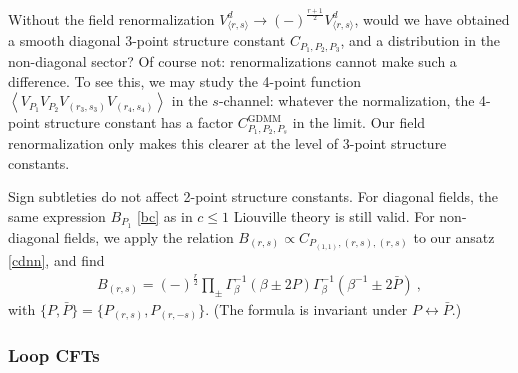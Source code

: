 \documentclass[12pt, a4paper]{article}
\begin{document}
Without the field renormalization $V^d_{\langle r,s\rangle}\to (-)^{\frac{r+1}{2}} V^d_{\langle r,s\rangle}$, would we have obtained a smooth diagonal 3-point structure constant $C_{P_1,P_2,P_3}$, and a distribution in the non-diagonal sector? Of course not: renormalizations cannot make such a difference. To see this, we may study the 4-point function $\left<V_{P_1}V_{P_2}V_{(r_3,s_3)}V_{(r_4,s_4)}\right>$ in the $s$-channel: whatever the normalization, the 4-point structure constant has a factor $C^\text{GDMM}_{P_1,P_2,P_s}$ in the limit. Our field renormalization only makes this clearer at the level of 3-point structure constants. 

Sign subtleties do not affect 2-point structure constants. For diagonal fields, the same expression $B_{P_1}$ \eqref{bc} as in $c\leq 1$ Liouville theory is still valid. For non-diagonal fields, we apply the relation $B_{(r,s)}\propto C_{P_{(1,1)},(r,s),(r,s)}$ to our ansatz \eqref{cdnn}, and find 
\begin{align}
 \boxed{B_{(r,s)} = (-)^\frac{r}{2} \prod_\pm \Gamma_\beta^{-1}\left(\beta\pm 2P\right)\Gamma_\beta^{-1}\left(\beta^{-1}\pm 2\bar P\right)}\ ,
 \label{nbrs}
\end{align}
with $\{P,\bar P\}=\{P_{(r,s)},P_{(r,-s)}\}$. (The formula is invariant under $P\leftrightarrow \bar P$.)

\subsubsection{Loop CFTs}
\end{document}
